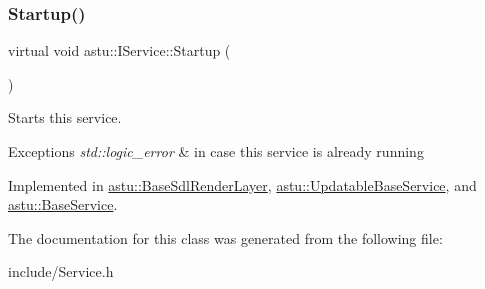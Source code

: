 \mbox{\label{classastu_1_1IService_a7a09e485d116659f174aca9a8494fa55}} 
\subsubsection{\texorpdfstring{Startup()}{Startup()}}
{\footnotesize\ttfamily virtual void astu\+::\+I\+Service\+::\+Startup (\begin{DoxyParamCaption}{ }\end{DoxyParamCaption})\hspace{0.3cm}{\ttfamily [pure virtual]}}

Starts this service.


\begin{DoxyExceptions}{Exceptions}
{\em std\+::logic\+\_\+error} & in case this service is already running \\
\hline
\end{DoxyExceptions}


Implemented in \hyperlink{classastu_1_1BaseSdlRenderLayer_a0f4fbd9bbd5613589a8f1ce39d8b6340}{astu\+::\+Base\+Sdl\+Render\+Layer}, \hyperlink{classastu_1_1UpdatableBaseService_a47e3725f717cee3cd8983f485b2a0243}{astu\+::\+Updatable\+Base\+Service}, and \hyperlink{classastu_1_1BaseService_a59dade033dcb44dd32155c526a3a58e2}{astu\+::\+Base\+Service}.



The documentation for this class was generated from the following file\+:\begin{DoxyCompactItemize}
\item 
include/Service.\+h\end{DoxyCompactItemize}
